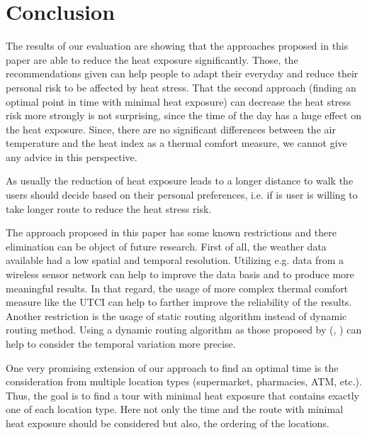 
\section{Conclusion}

The results of our evaluation are showing that the approaches proposed in this paper are able to reduce the heat exposure significantly. Those, the recommendations given can help people to adapt their everyday and reduce their personal risk to be affected by heat stress. That the second approach (finding an optimal point in time with minimal heat exposure)  can decrease the heat stress risk more strongly is not surprising, since the time of the day has a huge effect on the heat exposure. Since, there are no significant differences between the air temperature and the heat index as a thermal comfort measure, we cannot give any advice in this perspective. 

As usually the reduction of heat exposure leads to a longer distance to walk the users should decide based on their personal preferences, i.e. if is user is willing to take longer route to reduce the heat stress risk.

The approach proposed in this paper has some known restrictions and there elimination can be object of future research. First of all, the weather data available had a low spatial and temporal resolution. Utilizing e.g. data from a wireless sensor network can help to improve the data basis and to produce more meaningful results. In that regard, the usage of more complex thermal comfort measure like the UTCI can help to farther improve the reliability of the results. Another restriction is the usage of static routing algorithm instead of dynamic routing method. Using a dynamic routing algorithm as those proposed by \citeauthor{Dang2012} (\citeyear{Dang2012}, \citeyear{Dang2013}) can help to consider the temporal variation more precise.

One very promising extension of our approach to find an optimal time is the consideration from multiple location types (supermarket, pharmacies, ATM, etc.). Thus, the goal is to find a tour with minimal heat exposure that contains exactly one of each location type. Here not only the time and the route with minimal heat exposure should be considered but also, the ordering of the locations.  
